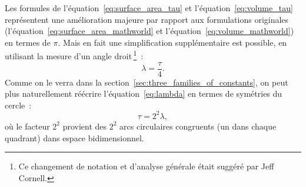Les formules de l'équation~\eqref{eq:surface_area_tau} et l'équation~\eqref{eq:volume_tau} représentent une amélioration majeure par rapport aux formulations originales (l'équation~\eqref{eq:surface_area_mathworld} et l'équation~\eqref{eq:volume_mathworld}) en termes de $\pi$. Mais en fait une simplification supplémentaire est possible, en utilisant la mesure d'un angle droit\,\footnote{Ce changement de notation et d'analyse générale était suggéré par Jeff Cornell.}~:
\begin{equation}
\label{eq:lambda}
\lambda = \frac{\tau}{4}.
\end{equation}
Comme on le verra dans la section~\ref{sec:three_families_of_constants}, on peut plus naturellement réécrire l'équation~\eqref{eq:lambda} en termes de symétries du cercle~:
\begin{equation}
\label{eq:tau_lambda}
\tau = 2^2 \lambda,
\end{equation}
où le facteur $2^2$ provient des $2^2$ arcs circulaires congruents (un dans chaque quadrant) dans espace bidimensionnel.

